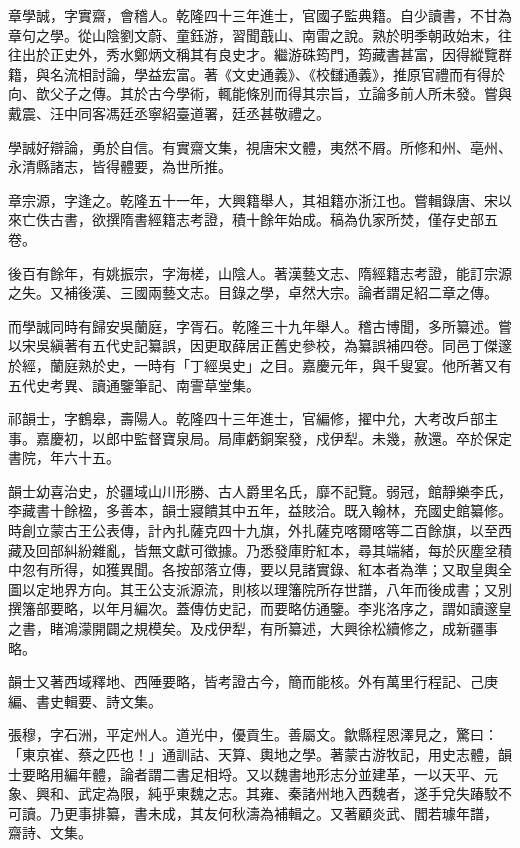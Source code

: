 \begin{pinyinscope}
章學誠，字實齋，會稽人。乾隆四十三年進士，官國子監典籍。自少讀書，不甘為章句之學。從山陰劉文蔚、童鈺游，習聞蕺山、南雷之說。熟於明季朝政始末，往往出於正史外，秀水鄭炳文稱其有良史才。繼游硃筠門，筠藏書甚富，因得縱覽群籍，與名流相討論，學益宏富。著《文史通義》、《校讎通義》，推原官禮而有得於向、歆父子之傳。其於古今學術，輒能條別而得其宗旨，立論多前人所未發。嘗與戴震、汪中同客馮廷丞寧紹臺道署，廷丞甚敬禮之。

學誠好辯論，勇於自信。有實齋文集，視唐宋文體，夷然不屑。所修和州、亳州、永清縣諸志，皆得體要，為世所推。

章宗源，字逢之。乾隆五十一年，大興籍舉人，其祖籍亦浙江也。嘗輯錄唐、宋以來亡佚古書，欲撰隋書經籍志考證，積十餘年始成。稿為仇家所焚，僅存史部五卷。

後百有餘年，有姚振宗，字海槎，山陰人。著漢藝文志、隋經籍志考證，能訂宗源之失。又補後漢、三國兩藝文志。目錄之學，卓然大宗。論者謂足紹二章之傳。

而學誠同時有歸安吳蘭庭，字胥石。乾隆三十九年舉人。稽古博聞，多所纂述。嘗以宋吳縝著有五代史記纂誤，因更取薛居正舊史參校，為纂誤補四卷。同邑丁傑邃於經，蘭庭熟於史，一時有「丁經吳史」之目。嘉慶元年，與千叟宴。他所著又有五代史考異、讀通鑒筆記、南霅草堂集。

祁韻士，字鶴皋，壽陽人。乾隆四十三年進士，官編修，擢中允，大考改戶部主事。嘉慶初，以郎中監督寶泉局。局庫虧銅案發，戍伊犁。未幾，赦還。卒於保定書院，年六十五。

韻士幼喜治史，於疆域山川形勝、古人爵里名氏，靡不記覽。弱冠，館靜樂李氏，李藏書十餘楹，多善本，韻士寢饋其中五年，益賅洽。既入翰林，充國史館纂修。時創立蒙古王公表傳，計內扎薩克四十九旗，外扎薩克喀爾喀等二百餘旗，以至西藏及回部糾紛雜亂，皆無文獻可徵據。乃悉發庫貯紅本，尋其端緒，每於灰塵坌積中忽有所得，如獲異聞。各按部落立傳，要以見諸實錄、紅本者為準；又取皇輿全圖以定地界方向。其王公支派源流，則核以理籓院所存世譜，八年而後成書；又別撰籓部要略，以年月編次。蓋傳仿史記，而要略仿通鑒。李兆洛序之，謂如讀邃皇之書，睹鴻濛開闢之規模矣。及戍伊犁，有所纂述，大興徐松續修之，成新疆事略。

韻士又著西域釋地、西陲要略，皆考證古今，簡而能核。外有萬里行程記、己庚編、書史輯要、詩文集。

張穆，字石洲，平定州人。道光中，優貢生。善屬文。歙縣程恩澤見之，驚曰：「東京崔、蔡之匹也！」通訓詁、天算、輿地之學。著蒙古游牧記，用史志體，韻士要略用編年體，論者謂二書足相埒。又以魏書地形志分並建革，一以天平、元象、興和、武定為限，純乎東魏之志。其雍、秦諸州地入西魏者，遂手兌失踳駮不可讀。乃更事排纂，書未成，其友何秋濤為補輯之。又著顧炎武、閻若璩年譜，齋詩、文集。


\end{pinyinscope}
